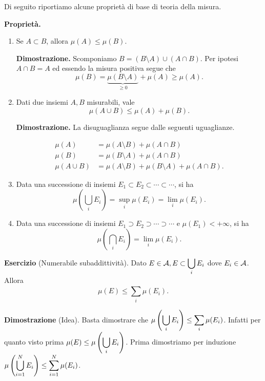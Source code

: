 %
%



Di seguito riportiamo alcune proprietà di base di teoria della misura.

\textbf{Proprietà.}

\begin{enumerate}
\item Se $A \subset B$, allora $\mu(A) \leq \mu(B)$.

\textbf{Dimostrazione.}
Scomponiamo $B = (B \setminus A) \cup (A \cap B)$. Per ipotesi $A \cap B = A$ ed essendo la misura positiva segue che
$$
	\mu(B) = \underbrace{\mu(B \setminus A)}_{\geq 0} + \mu(A) \geq \mu(A).
$$

\item \label{item:misura_unione_finita} Dati due insiemi $A,B$ misurabili, vale
$$
	\mu(A \cup B) \leq \mu(A) + \mu(B).
$$

\textbf{Dimostrazione.}
La disuguaglianza segue dalle seguenti uguaglianze.

\begin{align*}
	\mu(A) & = \mu(A \setminus B) + \mu(A \cap B) \\
	\mu(B) & = \mu(B \setminus A) + \mu(A \cap B) \\
	\mu(A \cup B) & = \mu(A \setminus B ) + \mu(B \setminus A) + \mu(A \cap B).
\end{align*}

\item Data una successione di insiemi $E_1 \subset E_2 \subset \cdots \subset \cdots$, si ha
$$
	\mu \left( \bigcup_{i} E_i \right) = \sup_i \mu(E_i) = \lim_i \mu (E_i).
$$

\item Data una successione di insiemi $E_1 \supset E_2 \supset \cdots \supset \cdots$ e $\mu(E_1) < +\infty$, si ha
$$
	\mu \left( \bigcap_{i} E_i \right) = \lim_i \mu (E_i).
$$
\end{enumerate}

\textbf{Esercizio} (Numerabile subaddittività).
Dato $\displaystyle E \in \mathcal{A}, E \subset \bigcup_i E_i$ dove $E_i \in \mathcal{A}$. Allora
$$
	\mu(E) \leq \sum_{i}^{} \mu(E_i).
$$

\textbf{Dimostrazione} (Idea).
Basta dimostrare che $\displaystyle \mu \left( \bigcup_i E_i \right) \leq \sum_{i}^{} \mu(E_i)$. Infatti per quanto visto prima $\displaystyle \mu(E) \leq \mu \left( \bigcup_i E_i \right)$. Prima dimostriamo per induzione $\displaystyle \mu \left( \bigcup_{i = 1}^N E_i \right) \leq \sum_{i=1}^{N} \mu(E_i)$. 


